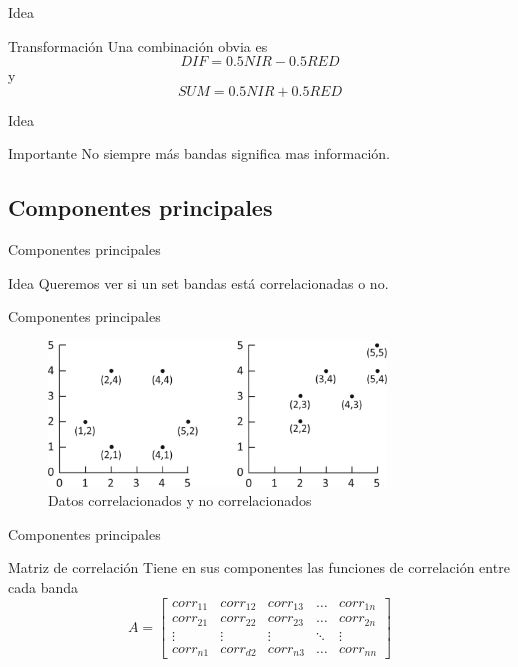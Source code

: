 \documentclass[handout]{beamer}
\begin{document}
\begin{frame}{Idea}
  \begin{alertblock}{Transformación}
    Una combinación obvia es $$ DIF = 0.5NIR-0.5RED$$
    y
    $$ SUM = 0.5NIR+0.5RED $$
  \end{alertblock}
\end{frame}


\begin{frame}{Idea}
  \begin{alertblock}{Importante}
    No siempre más bandas significa mas información.
  \end{alertblock}
\end{frame}

\subsection{Componentes principales}

\begin{frame}{Componentes principales}
  \begin{block}{Idea}
    Queremos ver si un set bandas está correlacionadas o no.
  \end{block}
\end{frame}

\begin{frame}{Componentes principales}
  \begin{figure}
  \centering
  \includegraphics[width=0.8\textwidth]{imagenes/corr.png}
  \caption{Datos correlacionados y no correlacionados}
  \end{figure}
\end{frame}



\begin{frame}{Componentes principales}
  \begin{block}{Matriz de correlación}
    Tiene en sus componentes las funciones de correlación entre cada banda\pause
    \[
    A = \begin{bmatrix}
        corr_{11}       & corr_{12} & corr_{13} & \dots & corr_{1n} \\
        corr_{21}       & corr_{22} & corr_{23} & \dots & corr_{2n} \\
        \vdots          & \vdots    & \vdots    & \ddots & \vdots \\
        corr_{n1}       & corr_{d2} & corr_{n3} & \dots & corr_{nn}
    \end{bmatrix} \]
  \end{block}
\end{frame}
\end{document}
